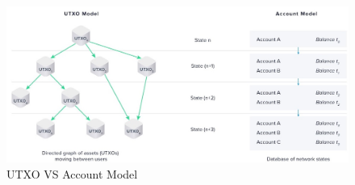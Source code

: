 \begin{figure}[h!]
    \centering
    \includegraphics[scale=1.2]{Figures/utxo_vs_account_model.jpg}
    \caption{UTXO VS Account Model \cite{UTXOvsACCOUNT}}
\end{figure}

